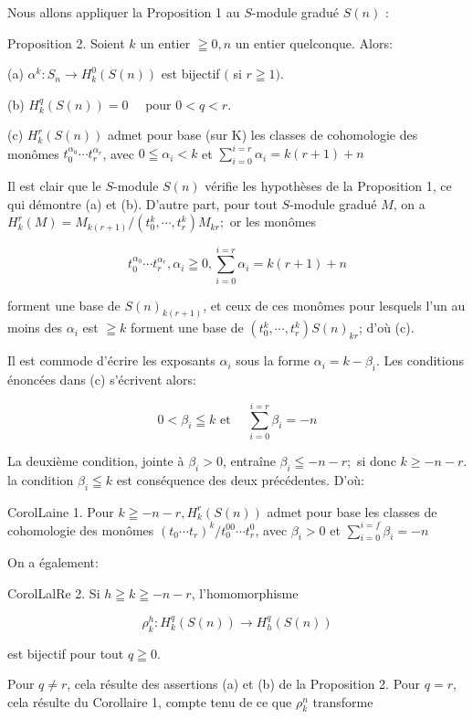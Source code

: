 Nous allons appliquer la Proposition 1 au $S$-module gradué $S(n)$ :

Proposition 2. Soient $k$ un entier $\geqq 0, n$ un entier quelconque. Alors:

(a) $\alpha^{k}: S_{n} \rightarrow H_{k}^{0}(S(n))$ est bijectif $($ si $r \geqq 1)$.

(b) $H_{k}^{q}(S(n))=0 \quad$ pour $0<q<r$.

(c) $H_{k}^{r}(S(n))$ admet pour base (sur K) les classes de cohomologie des monômes $t_{0}^{\alpha_{0}} \cdots t_{r}^{\alpha_{r}}$, avec $0 \leqq \alpha_{i}<k$ et $\sum_{i=0}^{i=r} \alpha_{i}=k(r+1)+n$

Il est clair que le $S$-module $S(n)$ vérifie les hypothèses de la Proposition 1, ce qui démontre (a) et (b). D'autre part, pour tout $S$-module gradué $M$, on a $H_{k}^{r}(M)=M_{k(r+1)} /\left(t_{0}^{k}, \cdots, t_{r}^{k}\right) M_{k r} ;$ or les monômes

$$
t_{0}^{\alpha_{0}} \cdots t_{r}^{\alpha_{r}}, \alpha_{i} \geqq 0, \sum_{i=0}^{i=r} \alpha_{i}=k(r+1)+n
$$

forment une base de $S(n)_{k(r+1)}$, et ceux de ces monômes pour lesquels l'un au moins des $\alpha_{i}$ est $\geqq k$ forment une base de $\left(t_{0}^{k}, \cdots, t_{r}^{k}\right) S(n)_{k r}$; d'où (c).

Il est commode d'écrire les exposants $\alpha_{i}$ sous la forme $\alpha_{i}=k-\beta_{i} .$ Les conditions énoncées dans (c) s'écrivent alors:

$$
0<\beta_{i} \leqq k \text { et } \quad \sum_{i=0}^{i=r} \beta_{i}=-n
$$

La deuxième condition, jointe à $\beta_{i}>0$, entraîne $\beta_{i} \leqq-n-r ;$ si donc $k \geq-n-r$. la condition $\beta_{i} \leqq k$ est conséquence des deux précédentes. D'où:

CorolLaine 1. Pour $k \geqq-n-r, H_{k}^{r}(S(n))$ admet pour base les classes de cohomologie des monômes $\left(t_{0} \cdots t_{r}\right)^{k} / t_{0}^{00} \cdots t_{r}^{0}$, avec $\beta_{i}>0$ et $\sum_{i=0}^{i=f} \beta_{i}=-n$

On a également:

CorolLalRe 2. Si $h \geqq k \geqq-n-r$, l'homomorphisme

$$
\rho_{k}^{h}: H_{k}^{q}(S(n)) \rightarrow H_{h}^{q}(S(n))
$$

est bijectif pour tout $q \geqq 0$.

Pour $q \neq r$, cela résulte des assertions (a) et (b) de la Proposition 2. Pour $q=r$, cela résulte du Corollaire 1, compte tenu de ce que $\rho_{k}^{n}$ transforme


